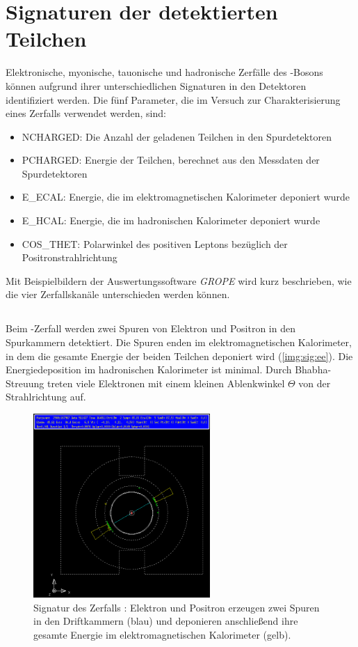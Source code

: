 \section{Signaturen der detektierten Teilchen}
Elektronische, myonische, tauonische und hadronische Zerfälle
des \Z-Bosons können aufgrund ihrer unterschiedlichen Signaturen in den
Detektoren identifiziert werden.
Die fünf Parameter, die im Versuch zur Charakterisierung eines Zerfalls verwendet werden, sind:
\begin{itemize}
  \item NCHARGED: Die Anzahl der geladenen Teilchen in den Spurdetektoren
  \item PCHARGED: Energie der Teilchen, berechnet aus den Messdaten der Spurdetektoren
  \item E\_ECAL: Energie, die im elektromagnetischen Kalorimeter deponiert wurde
  \item E\_HCAL: Energie, die im hadronischen Kalorimeter deponiert wurde
  \item COS\_THET: Polarwinkel des positiven Leptons bezüglich der Positronstrahlrichtung
\end{itemize}
Mit Beispielbildern der Auswertungssoftware \emph{GROPE} wird kurz beschrieben,
wie die vier Zerfallskanäle unterschieden werden können.
\subsection*{\Zee}
Beim \Zee-Zerfall werden zwei Spuren von Elektron und Positron in den Spurkammern detektiert.
Die Spuren enden im elektromagnetischen Kalorimeter,
in dem die gesamte Energie der beiden Teilchen deponiert wird (\autoref{img:sig:ee}).
Die Energiedeposition im hadronischen Kalorimeter ist minimal.
Durch Bhabha-Streuung treten viele Elektronen
mit einem kleinen Ablenkwinkel $\Theta$
von der Strahlrichtung auf.

\begin{figure}[H]
\begin{center}
  \includegraphics[width=0.6\textwidth]{../img/gropepics/ee1b.png}
  \caption{Signatur des Zerfalls \Zee: Elektron und Positron erzeugen zwei Spuren in den Driftkammern (blau)
  und deponieren anschließend ihre gesamte Energie im elektromagnetischen Kalorimeter (gelb).}
  \label{img:sig:ee}
\end{center}
\end{figure} 

